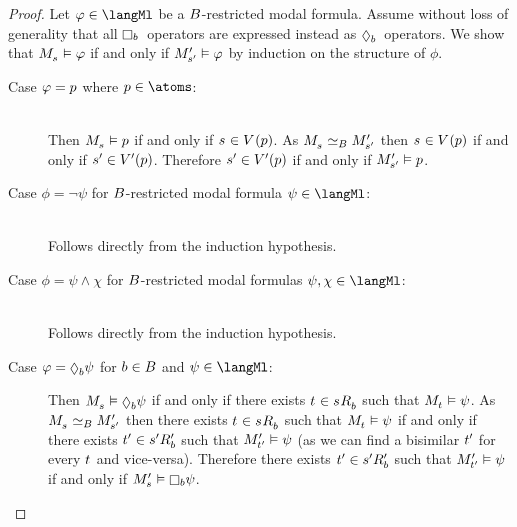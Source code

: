 \begin{proof}
Let $\phi \in \langMl$ be a $B$-restricted modal formula.
Assume without loss of generality that all $\necessaryB$~operators are expressed instead as $\possibleB$~operators.
We show that $\kPModel{\kStateS} \entails \phi$ if and only if ${M^{\prime}_{{s}^{\prime}}} \vDash \varphi$ by induction on the structure of $\phi$.

\begin{description}
    \item[Case $\varphi = p$ where $\atomP \in \atoms$:]\hfill\\
        Then $\kPModel{\kStateS} \entails \atomP$ if and only if $\kStateS \in \kValuation(\atomP)$.
        As $\kPModel{\kStateS} \bisimilar[\agentsB] \kPModelP{\kStateSP}$ then $\kStateS \in \kValuation(\atomP)$ if and only if ${s}^{\prime} \in {V^{\prime}}(p)$.
        Therefore ${s}^{\prime} \in {V^{\prime}}(p)$ if and only if ${M^{\prime}_{{s}^{\prime}}} \vDash p$.

    \item[Case $\phi = \lnot \psi$ for $B$-restricted modal formula $\psi \in \langMl$:]\hfill\\
        Follows directly from the induction hypothesis.

    \item[Case $\phi = \psi \land \chi$ for $B$-restricted modal formulas $\psi, \chi \in \langMl$:]\hfill\\
        Follows directly from the induction hypothesis.

    \item[{Case $\phi = \possibleB \psi$ for $b \in B$ and $\psi \in \langMl$:}]
        Then $\kPModel{\kStateS} \entails \possibleB \psi$ if and only if there exists $\kStateT \in \kSuccessorsB{\kStateS}$ such that $\kPModel{\kStateT} \entails \psi$.
        As $\kPModel{\kStateS} \bisimilar[\agentsB] \kPModelP{\kStateSP}$ then there exists $\kStateT \in \kSuccessorsB{\kStateS}$ such that $\kPModel{\kStateT} \entails \psi$ if and only if there exists ${t}^{\prime} \in {{s}^{\prime}} {R^{\prime}_{b}}$ such that ${M^{\prime}_{{t}^{\prime}}} \vDash \psi$ (as we can find a bisimilar ${t}^{\prime}$ for every $\kStateT$ and vice-versa).
        Therefore there exists ${t}^{\prime} \in {{s}^{\prime}} {R^{\prime}_{b}}$ such that ${M^{\prime}_{{t}^{\prime}}} \vDash \psi$ if and only if $\kPModelP{\kStateS} \entails \necessary[\agentB] \psi$.
\end{description}
\end{proof}

